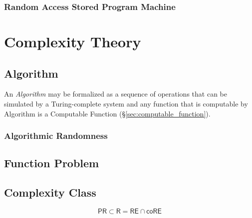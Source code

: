 \documentclass{article}
\begin{document}
\subsubsection{Random Access Stored Program Machine}



\section{Complexity Theory}\label{sec:complexity_theory}

\subsection{Algorithm}\label{subsec:algorithm}

An \emph{Algorithm} may be formalized as a sequence of operations that
can be simulated by a Turing-complete system and any function that is
computable by Algorithm is a Computable Function
(\S\ref{sec:computable_function}).

\subsubsection{Algorithmic Randomness}\label{subsec:algorithmic_randomness}

\subsection{Function Problem}\label{subsec:function_problem}

\subsection{Complexity Class}\label{subsec:complexity_class}

\[
    \mathsf{PR} \subset \mathsf{R} = \mathsf{RE} \cap \mathsf{coRE}
\]



\end{document}
